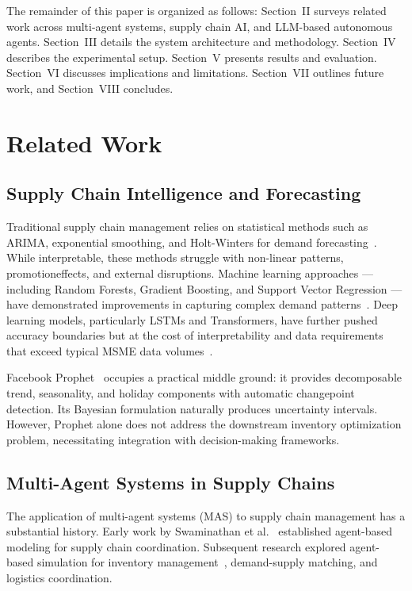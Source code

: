 \documentclass[conference]{IEEEtran}
\begin{document}
The remainder of this paper is organized as follows: Section~II surveys related work across multi-agent systems, supply chain AI, and LLM-based autonomous agents. Section~III details the system architecture and methodology. Section~IV describes the experimental setup. Section~V presents results and evaluation. Section~VI discusses implications and limitations. Section~VII outlines future work, and Section~VIII concludes.

\section{Related Work}

\subsection{Supply Chain Intelligence and Forecasting}

Traditional supply chain management relies on statistical methods such as ARIMA, exponential smoothing, and Holt-Winters for demand forecasting~\cite{chopra2021supply}. While interpretable, these methods struggle with non-linear patterns, promotioneffects, and external disruptions. Machine learning approaches --- including Random Forests, Gradient Boosting, and Support Vector Regression --- have demonstrated improvements in capturing complex demand patterns~\cite{ml_dl_forecasting}. Deep learning models, particularly LSTMs and Transformers, have further pushed accuracy boundaries but at the cost of interpretability and data requirements that exceed typical MSME data volumes~\cite{transformer_forecast}.

Facebook Prophet~\cite{taylor2018prophet} occupies a practical middle ground: it provides decomposable trend, seasonality, and holiday components with automatic changepoint detection. Its Bayesian formulation naturally produces uncertainty intervals. However, Prophet alone does not address the downstream inventory optimization problem, necessitating integration with decision-making frameworks.

\subsection{Multi-Agent Systems in Supply Chains}

The application of multi-agent systems (MAS) to supply chain management has a substantial history. Early work by Swaminathan et al.~\cite{swaminathan1998multiagent} established agent-based modeling for supply chain coordination. Subsequent research explored agent-based simulation for inventory management~\cite{mas_scm_insights}, demand-supply matching, and logistics coordination.
\end{document}

